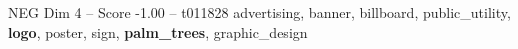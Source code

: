 \begin{textsample}{NEG Dim 4 – Score -1.00 – t011828}  \label{ex:f4_neg_027}
advertising, banner, billboard, public\_utility, \textbf{logo}, poster, sign, \textbf{palm\_trees}, graphic\_design

\end{textsample}
